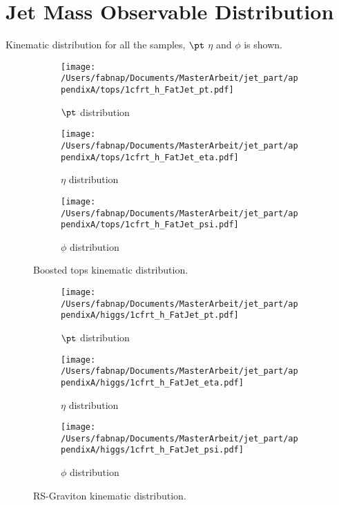 
\chapter{Jet Mass Observable Distribution}
\label{appendixA}
Kinematic distribution for all the samples, $\pt$ $\eta$ and $\phi$ is shown.

\begin{figure}
    \centering
    \begin{subfigure}[b]{0.45\textwidth}
        \texttt{[image: /Users/fabnap/Documents/MasterArbeit/jet\_part/appendixA/tops/1cfrt\_h\_FatJet\_pt.pdf]}
        \caption{$\pt$ distribution}
        \label{fig:gull}
    \end{subfigure}
    \begin{subfigure}[b]{0.45\textwidth}
        \texttt{[image: /Users/fabnap/Documents/MasterArbeit/jet\_part/appendixA/tops/1cfrt\_h\_FatJet\_eta.pdf]}
        \caption{$\eta$ distribution}
        \label{fig:tiger}
    \end{subfigure}
    \begin{subfigure}[b]{0.45\textwidth}
        \texttt{[image: /Users/fabnap/Documents/MasterArbeit/jet\_part/appendixA/tops/1cfrt\_h\_FatJet\_psi.pdf]}
        \caption{$\phi$ distribution}
        \label{fig:mouse}
    \end{subfigure}
    \caption{Boosted tops kinematic distribution.}\label{fig:animals}
\end{figure}


\begin{figure}
    \centering
    \begin{subfigure}[b]{0.45\textwidth}
        \texttt{[image: /Users/fabnap/Documents/MasterArbeit/jet\_part/appendixA/higgs/1cfrt\_h\_FatJet\_pt.pdf]}
        \caption{$\pt$ distribution}
        \label{fig:gull}
    \end{subfigure}
    \begin{subfigure}[b]{0.45\textwidth}
        \texttt{[image: /Users/fabnap/Documents/MasterArbeit/jet\_part/appendixA/higgs/1cfrt\_h\_FatJet\_eta.pdf]}
        \caption{$\eta$ distribution}
        \label{fig:tiger}
    \end{subfigure}
    \begin{subfigure}[b]{0.45\textwidth}
        \texttt{[image: /Users/fabnap/Documents/MasterArbeit/jet\_part/appendixA/higgs/1cfrt\_h\_FatJet\_psi.pdf]}
        \caption{$\phi$ distribution}
        \label{fig:mouse}
    \end{subfigure}
    \caption{RS-Graviton kinematic distribution.}\label{fig:animals}
\end{figure}

